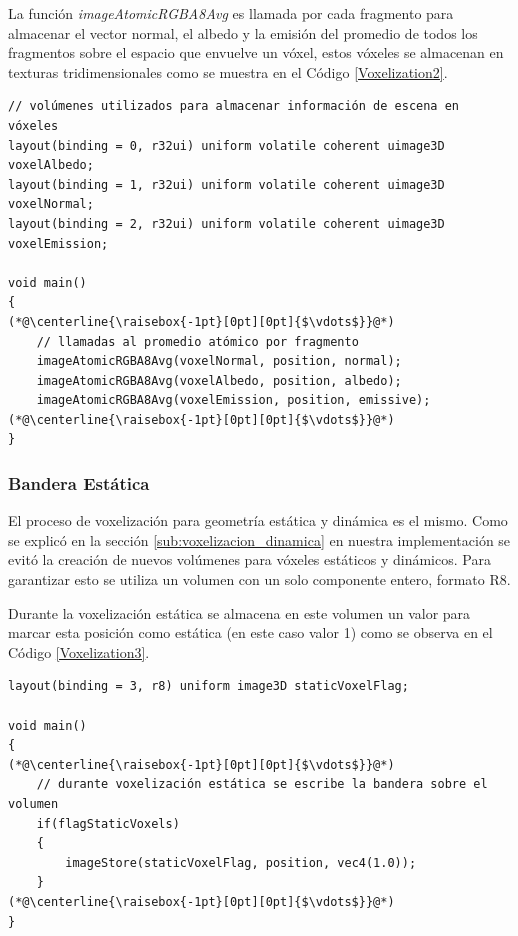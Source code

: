 La función \emph{imageAtomicRGBA8Avg} es llamada por cada fragmento para almacenar el vector normal, el albedo y la emisión del promedio de todos los fragmentos sobre el espacio que envuelve un vóxel, estos vóxeles se almacenan en texturas tridimensionales como se muestra en el Código \ref{Voxelization2}.
\\
\begin{lstlisting}[caption={Composición de fragmentos y vóxeles}, label=Voxelization2]
// volúmenes utilizados para almacenar información de escena en vóxeles
layout(binding = 0, r32ui) uniform volatile coherent uimage3D voxelAlbedo;
layout(binding = 1, r32ui) uniform volatile coherent uimage3D voxelNormal;
layout(binding = 2, r32ui) uniform volatile coherent uimage3D voxelEmission;

void main()
{
(*@\centerline{\raisebox{-1pt}[0pt][0pt]{$\vdots$}}@*)
    // llamadas al promedio atómico por fragmento
    imageAtomicRGBA8Avg(voxelNormal, position, normal);
    imageAtomicRGBA8Avg(voxelAlbedo, position, albedo);
    imageAtomicRGBA8Avg(voxelEmission, position, emissive);
(*@\centerline{\raisebox{-1pt}[0pt][0pt]{$\vdots$}}@*)
}
\end{lstlisting}

\subsubsection{Bandera Estática}
El proceso de voxelización para geometría estática y dinámica es el mismo. Como se explicó en la sección \ref{sub:voxelizacion_dinamica} en nuestra implementación se evitó la creación de nuevos volúmenes para vóxeles estáticos y dinámicos. Para garantizar esto se utiliza un volumen con un solo componente entero, formato R8.

Durante la voxelización estática se almacena en este volumen un valor para marcar esta posición como estática (en este caso valor 1) como se observa en el Código \ref{Voxelization3}. 
\\
\begin{lstlisting}[caption={Escritura de la bandera estática durante voxelización de geometría estática}, label=Voxelization3]
layout(binding = 3, r8) uniform image3D staticVoxelFlag;

void main()
{
(*@\centerline{\raisebox{-1pt}[0pt][0pt]{$\vdots$}}@*)
    // durante voxelización estática se escribe la bandera sobre el volumen
    if(flagStaticVoxels)
    {
        imageStore(staticVoxelFlag, position, vec4(1.0));
    }
(*@\centerline{\raisebox{-1pt}[0pt][0pt]{$\vdots$}}@*)
}
\end{lstlisting}

